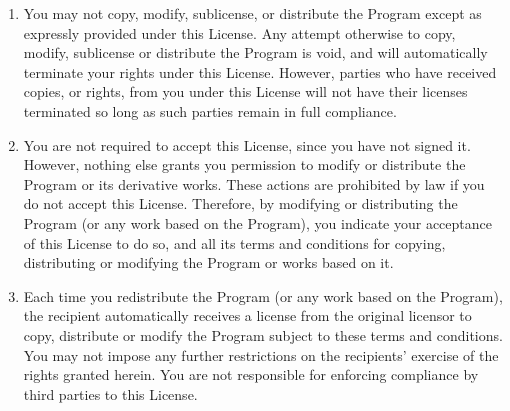 \documentclass{book}
\begin{document}
{\begin{enumerate}
\begin{enumerate}
\end{enumerate}


The source code for a work means the preferred form of the work for
making modifications to it.  For an executable work, complete source
code means all the source code for all modules it contains, plus any
associated interface definition files, plus the scripts used to
control compilation and installation of the executable.  However, as a
special exception, the source code distributed need not include
anything that is normally distributed (in either source or binary
form) with the major components (compiler, kernel, and so on) of the
operating system on which the executable runs, unless that component
itself accompanies the executable.

If distribution of executable or object code is made by offering
access to copy from a designated place, then offering equivalent
access to copy the source code from the same place counts as
distribution of the source code, even though third parties are not
compelled to copy the source along with the object code.

\item
You may not copy, modify, sublicense, or distribute the Program
except as expressly provided under this License.  Any attempt
otherwise to copy, modify, sublicense or distribute the Program is
void, and will automatically terminate your rights under this License.
However, parties who have received copies, or rights, from you under
this License will not have their licenses terminated so long as such
parties remain in full compliance.

\item
You are not required to accept this License, since you have not
signed it.  However, nothing else grants you permission to modify or
distribute the Program or its derivative works.  These actions are
prohibited by law if you do not accept this License.  Therefore, by
modifying or distributing the Program (or any work based on the
Program), you indicate your acceptance of this License to do so, and
all its terms and conditions for copying, distributing or modifying
the Program or works based on it.

\item
Each time you redistribute the Program (or any work based on the
Program), the recipient automatically receives a license from the
original licensor to copy, distribute or modify the Program subject to
these terms and conditions.  You may not impose any further
restrictions on the recipients' exercise of the rights granted herein.
You are not responsible for enforcing compliance by third parties to
this License.


\end{enumerate}}
\end{document}
